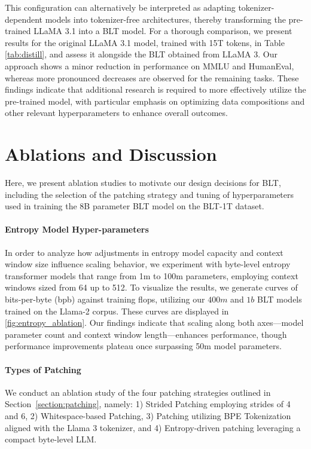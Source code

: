 This configuration can alternatively be interpreted as adapting tokenizer-dependent models into tokenizer-free architectures, thereby transforming the pre-trained LLaMA 3.1 into a {\textsc BLT} model. For a thorough comparison, we present results for the original LLaMA 3.1 model, trained with 15T tokens, in Table \ref{tab:distill}, and assess it alongside the {\textsc BLT} obtained from LLaMA 3. Our approach shows a minor reduction in performance on MMLU and HumanEval, whereas more pronounced decreases are observed for the remaining tasks. These findings indicate that additional research is required to more effectively utilize the pre-trained model, with particular emphasis on optimizing data compositions and other relevant hyperparameters to enhance overall outcomes.

\section{Ablations and Discussion}
\label{section:ablations}
Here, we present ablation studies to motivate our design decisions for {\textsc BLT}, including the selection of the patching strategy and tuning of hyperparameters used in training the 8B parameter {\textsc BLT} model on the {\textsc BLT}-1T dataset.

\paragraph{Entropy Model Hyper-parameters} In order to analyze how adjustments in entropy model capacity and context window size influence scaling behavior, we experiment with byte-level entropy transformer models that range from 1m to 100m parameters, employing context windows sized from 64 up to 512. To visualize the results, we generate curves of bits-per-byte (bpb) against training flops, utilizing our $400m$ and $1b$ {\textsc BLT} models trained on the Llama-2 corpus. These curves are displayed in \autoref{fig:entropy_ablation}. Our findings indicate that scaling along both axes—model parameter count and context window length—enhances performance, though performance improvements plateau once surpassing 50m model parameters.

\paragraph{Types of Patching}

We conduct an ablation study of the four patching strategies outlined in Section~\ref{section:patching}, namely: 1) Strided Patching employing strides of 4 and 6, 2) Whitespace-based Patching, 3) Patching utilizing BPE Tokenization aligned with the Llama 3 tokenizer, and 4) Entropy-driven patching leveraging a compact byte-level LLM.

